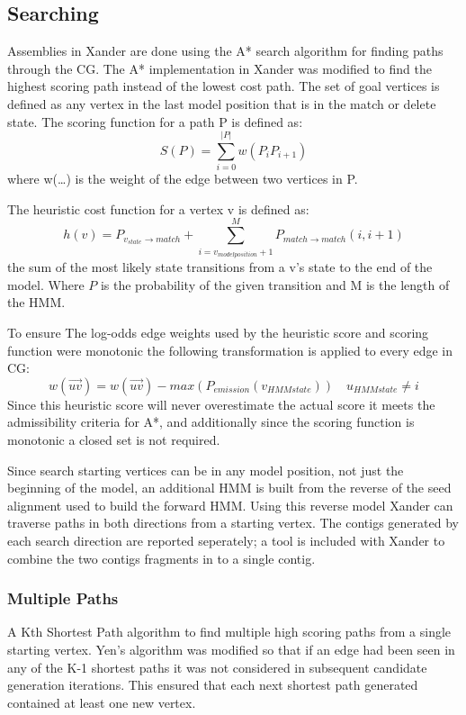 \documentclass[10pt]{bmc_article}
\newenvironment{bmcformat}{\begin{raggedright}\baselineskip20pt\sloppy\setboolean{publ}{false}}{\end{raggedright}\baselineskip20pt\sloppy}
\begin{document}
\begin{bmcformat}
\subsection*{Searching}
Assemblies in Xander are done using the A* search algorithm\cite{Hart1968} for finding paths through the CG.  The A* implementation in Xander was  modified to find the highest scoring path instead of the lowest cost path. The set of goal vertices is defined as any vertex in the last model position that is in the match or delete state.  The scoring function for a path P is defined as: 
\[S(P) = \sum_{i=0}^{|P|}w(P_iP_{i+1})\] 
where w(\ldots) is the weight of the edge between two vertices in P.

The heuristic cost function for a vertex v is defined as:
\[h(v) = P_{v_{state}\rightarrow match} + \sum_{i=v_{model position} + 1}^{M}P_{match\rightarrow match}(i, i + 1)\]
the sum of the most likely state transitions from a v's state to the end of the model. Where $P$ is the probability of the given transition and M is the length of the HMM.

To ensure The log-odds edge weights used by the heuristic score and scoring function were monotonic the following transformation is applied to every edge in CG:
\[ w(\overrightarrow{uv}) = w(\overrightarrow{uv}) - max(P_{emission}(v_{HMM state})) \quad u_{HMM state} \ne i\]
Since this heuristic score will never overestimate the actual score it meets the admissibility criteria for A*, and additionally since the scoring function is monotonic a closed set is not required.

Since search starting vertices can be in any model position, not just the beginning of the model, an additional HMM is built from the reverse of the seed alignment used to build the forward HMM.  Using this reverse model Xander can traverse paths in both directions from a starting vertex.  The contigs generated by each search direction are reported seperately; a tool is included with Xander to combine the two contigs fragments in to a single contig.

\subsubsection*{Multiple Paths}

A Kth Shortest Path algorithm\cite{Yen1971}\cite{Lawler1972} to find multiple high scoring paths from a single starting vertex.  Yen's algorithm was modified so that if an edge had been seen in any of the K-1 shortest paths it was not considered in subsequent candidate generation iterations.  This ensured that each next shortest path generated contained at least one new vertex.


\end{bmcformat}
\end{document}
